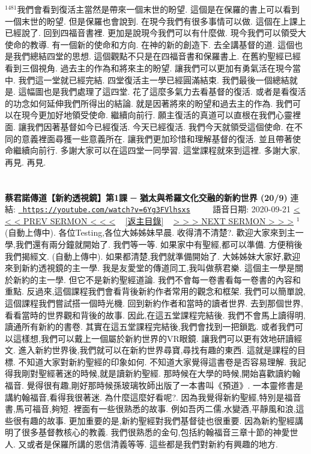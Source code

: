 \documentclass{book}
\begin{document}
$^{1481}$我們會看到復活主當然是帶來一個末世的盼望.
這個是在保羅的書上可以看到一個末世的盼望.
但是保羅也會說到.
在現今我們有很多事情可以做.
這個在上課上已經說了.
回到四福音書裡.
更加是說現今我們可以有什麼做.
現今我們可以領受大使命的教導.
有一個新的使命和方向.
在神的新的創造下.
去全講基督的道.
這個也是我們總結四堂的思想.
這個觀點不只是在四福音書和保羅書上.
在舊約聖經已經看到三個視角.
過去主的作為和將來主的盼望.
讓我們可以更加有勇氣活在現今當中.
我們這一堂就已經完結.
四堂復活主一學已經圓滿結束.
我們最後一個總結就是.
這幅圖也是我們處理了這四堂.
花了這麼多氣力去看基督的復活.
或者是看復活的功念如何延伸我們所得出的結論.
就是因著將來的盼望和過去主的作為.
我們可以在現今更加好地領受使命.
繼續向前行.
願主復活的真道可以直根在我們心靈裡面.
讓我們因著基督如今已經復活.
今天已經復活.
我們今天就領受這個使命.
在不同的意義裡面尋獲一些意義所在.
讓我們更加珍惜和理解基督的復活.
並且帶著使命繼續向前行.
多謝大家可以在這四堂一同學習.
這堂課程就來到這裡.
多謝大家,再見.
再見.
\newpage



\section{}
\label{sec:6Yg3FVlhsxs}
\textbf{蔡君諾傳道【新約透視鏡】第1課 ─ 猶太與希羅文化交融的新約世界 (20/9)}
\newline
\newline
連結: \href{https://youtube.com/watch?v=6Yg3FVlhsxs}{\texttt{ https://youtube.com/watch?v=6Yg3FVlhsxs}} ~~~~ 語音日期: 2020-09-21 
\newline
\newline
\hyperref[sec:UH_c8ivdgzM]{\small{< < < PREV SERMON < < <}}
~
\hyperref[sec:index]{\small{[返主目錄]}}
~
\hyperref[sec:meOlDsCMdvQ]{\small{> > > NEXT SERMON > > >}}
\newline
\newline
$^{1}$(自動上傳中).
各位Testing,各位大姊姊妹早晨.
收得清不清楚?.
歡迎大家來到主一學,我們還有兩分鐘就開始了.
我們等一等.
如果家中有聖經,都可以準備.
方便稍後我們揭經文.
(自動上傳中).
如果都清楚,我們就準備開始了.
大姊姊妹大家好,歡迎來到新約透視鏡的主一學.
我是友愛堂的傳道同工,我叫做蔡君樂.
這個主一學是關於新約的主一學.
但它不是新約聖經道論.
我們不會每一卷書看每一卷書的內容和重點.
反過來,這個課程我們會看背後新約作者常用的觀念和框架.
我們可以簡單說,這個課程我們嘗試搭一個時光機.
回到新約作者和當時的讀者世界.
去到那個世界,看看當時的世界觀和背後的故事.
因此,在這五堂課程完結後.
我們不會馬上讀得明,讀通所有新約的書卷.
其實在這五堂課程完結後,我們會找到一把鎖匙.
或者我們可以這樣想,我們可以戴上一個屬於新約世界的VR眼鏡.
讓我們可以更有效地研讀經文.
進入新約世界後,我們就可以在新約世界尋寶,尋找有趣的東西.
這就是課程的目標.
不知道大家對新約聖經的印象如何.
不知道大家覺得這書卷是否容易理解.
我記得我剛對聖經著迷的時候,就是讀新約聖經.
那時候在大學的時候,開始喜歡讀約翰福音.
覺得很有趣,剛好那時候孫玻璃牧師出版了一本書叫《預道》.
一本靈修書是講約翰福音,看得我很著迷.
為什麼這麼好看呢?.
因為我覺得新約聖經,特別是福音書,馬可福音,夠短.
裡面有一些很熟悉的故事.
例如吾丙二儒,水變酒,平靜風和浪,這些很有趣的故事.
更加重要的是,新約聖經對我們基督徒也很重要.
因為新約聖經講明了很多基督教核心的教義.
我們很熟悉的金句,包括約翰福音三章十節的神愛世人.
又或者是保羅所講的恩信清義等等.
這些都是我們對新約有興趣的地方.
\end{document}
